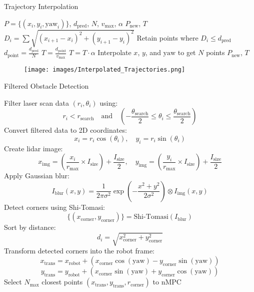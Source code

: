 \documentclass[conference]{IEEEtran}
\begin{document}
\begin{algorithm}
\caption{Trajectory Interpolation}
\begin{algorithmic}[1]
\REQUIRE $P = \{(x_i, y_i, \text{yaw}_i)\}$, $d_{\text{pred}}$, $N$, $v_{\text{max}}$, $\alpha$
\ENSURE $P_{\text{new}}$, $T$
\STATE $D_i = \sum \sqrt{(x_{i+1} - x_i)^2 + (y_{i+1} - y_i)^2}$
\STATE Retain points where $D_i \leq d_{\text{pred}}$
\STATE $d_{\text{point}} = \frac{d_{\text{pred}}}{N}$
\STATE $T = \frac{d_{\text{point}}}{v_{\text{max}}}$
\STATE $T = T \cdot \alpha$
\STATE Interpolate $x$, $y$, and $\text{yaw}$ to get $N$ points
\RETURN $P_{\text{new}}$, $T$
\end{algorithmic}
\end{algorithm}




\begin{figure}[!h]
    \centering
    \texttt{[image: images/Interpolated\_Trajectories.png]}
    \caption{ }
    \label{fig:nMPC_16_vs_DWA_12_vs_TEB_6_Path}
\end{figure}


\begin{algorithm}
\caption{Filtered Obstacle Detection}
\begin{algorithmic}[1]
\STATE Filter laser scan data $(r_i, \theta_i)$ using:
\[
r_i < r_{\text{search}} \quad \text{and} \quad \left( -\frac{\theta_{\text{search}}}{2} \leq \theta_i \leq \frac{\theta_{\text{search}}}{2} \right)
\]
\STATE Convert filtered data to 2D coordinates:
\[
x_i = r_i \cos(\theta_i), \quad y_i = r_i \sin(\theta_i)
\]
\STATE Create lidar image:
\[
x_{\text{img}} = \left( \frac{x_i}{r_{\text{max}}} \times I_{\text{size}} \right) + \frac{I_{\text{size}}}{2}, \quad y_{\text{img}} = \left( \frac{y_i}{r_{\text{max}}} \times I_{\text{size}} \right) + \frac{I_{\text{size}}}{2}
\]
\STATE Apply Gaussian blur:
\[
I_{\text{blur}}(x, y) = \frac{1}{2\pi \sigma^2} \exp\left(-\frac{x^2 + y^2}{2\sigma^2}\right) \otimes I_{\text{img}}(x, y)
\]
\STATE Detect corners using Shi-Tomasi:
\[
\{(x_{\text{corner}}, y_{\text{corner}})\} = \text{Shi-Tomasi}(I_{\text{blur}})
\]
\STATE Sort by distance:
\[
d_i = \sqrt{x_{\text{corner}}^2 + y_{\text{corner}}^2}
\]
\STATE Transform detected corners into the robot frame:
\[
x_{\text{trans}} = x_{\text{robot}} + (x_{\text{corner}} \cos(\text{yaw}) - y_{\text{corner}} \sin(\text{yaw}))
\]
\[
y_{\text{trans}} = y_{\text{robot}} + (x_{\text{corner}} \sin(\text{yaw}) + y_{\text{corner}} \cos(\text{yaw}))
\]
\STATE Select $N_{\text{max}}$ closest points
\RETURN $(x_{\text{trans}}, y_{\text{trans}}, r_{\text{corner}})$ to nMPC
\end{algorithmic}
\end{algorithm}
\end{document}
